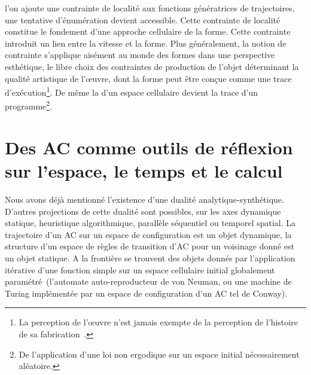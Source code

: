 l'on ajoute une contrainte de localit\'e aux fonctions g\'en\'eratrices de
trajectoires, une tentative d'\'enum\'eration devient accessible. %
Cette contrainte de localit\'e constitue le fondement d'une approche
cellulaire de la forme. %
Cette contrainte introduit un lien entre la vitesse et la forme. %
Plus g\'en\'eralement, la notion de contrainte s'applique ais\'ement au
monde des formes dans une perspective esth\'etique, le libre choix des
contraintes de production de l'objet d\'eterminant la qualit\'e artistique
de l'{\oe}uvre, dont la forme peut \^etre con\c{c}ue comme une trace
d'ex\'ecution\footnote{%
  La perception de l'{\oe}uvre n'est jamais exempte de la perception
  de l'histoire de sa fabrication~\cite[]{Gombrich71}.}. %
De m\^eme la  d'un espace cellulaire
devient la trace d'un programme\footnote{%
  De l'application d'une loi non ergodique sur un espace initial
  n\'ecessairement al\'eatoire.}. %

\section[AC, espace, temps et calcul]%
{Des AC comme outils de r\'eflexion sur l'espace, le temps et le calcul}

Nous avons d\'ej\`a mentionn\'e l'existence d'une dualit\'e
analytique-synth\'etique. %
D'autres projections de cette dualit\'e sont possibles, sur les axes
dynamique statique, heuristique algorithmique, parall\`ele s\'equentiel ou
temporel spatial. %
La trajectoire d'un AC sur un espace de configuration est un objet
dynamique, la structure d'un espace de r\`egles de transition d'AC pour
un voisinage donn\'e est un objet statique. %
A la fronti\`ere se trouvent des objets donn\'es par l'application
it\'erative d'une fonction simple sur un espace cellulaire initial
globalement param\'etr\'e~(l'automate auto-reproducteur de von Neuman, ou
une machine de Turing impl\'ement\'ee par un espace de configuration
d'un AC tel  de Conway). %

